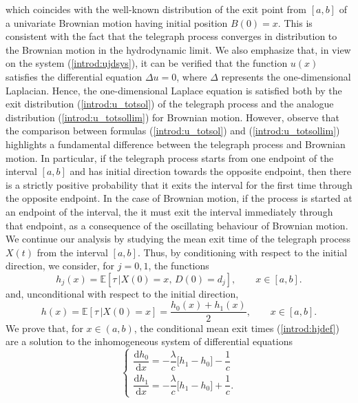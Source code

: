 \documentclass{article}
\begin{document}
which coincides with the well-known distribution of the exit point from $[a,b]$ of a univariate Brownian motion having initial position $B(0)=x$. This is consistent with the fact that the telegraph process converges in distribution to the Brownian motion in the hydrodynamic limit. We also emphasize that, in view on the system (\ref{introd:ujdsys}), it can be verified that the function $u(x)$ satisfies the differential equation $\Delta u = 0$, where $\Delta$ represents the one-dimensional Laplacian. Hence, the one-dimensional Laplace equation is satisfied both by the exit distribution (\ref{introd:u_totsol}) of the telegraph process and the analogue distribution (\ref{introd:u_totsollim}) for Brownian motion. However, observe that the comparison between formulas (\ref{introd:u_totsol}) and (\ref{introd:u_totsollim}) highlights a fundamental difference between the telegraph process and Brownian motion. In particular, if the telegraph process starts from one endpoint of the interval $[a,b]$ and has initial direction towards the opposite endpoint, then there is a strictly positive probability that it exits the interval for the first time through the opposite endpoint. In the case of Brownian motion, if the process is started at an endpoint of the interval, the it must exit the interval immediately through that endpoint, as a consequence of the oscillating behaviour of Brownian motion.\\
We continue our analysis by studying the mean exit time of the telegraph process $X(t)$ from the interval $[a,b]$. Thus, by conditioning with respect to the initial direction, we consider, for $j=0,1$, the functions
\begin{equation}h_j(x)=\mathbb{E}\left[\tau\,\Big\lvert X(0)=x,\,D(0)=d_j\right],\qquad x\in[a,b].\label{introd:hjdef}\end{equation} and, unconditional with respect to the initial direction,
\begin{equation*}h(x)=\mathbb{E}\left[\tau\,\Big\lvert X(0)=x\right]=\frac{h_0(x)+h_1(x)}{2},\qquad x\in[a,b].\end{equation*}%
We prove that, for $x\in(a,b)$, the conditional mean exit times (\ref{introd:hjdef}) are a solution to the inhomogeneous system of differential equations
\begin{equation}\label{introd:hjdsys}
\begin{cases}
\dfrac{\mathrm{d} h_0}{\mathrm{d}x}=-\dfrac{\lambda}{c}\big[h_1-h_0\big]-\dfrac{1}{c}\\[0.75em]
\dfrac{\mathrm{d} h_1}{\mathrm{d}x}=-\dfrac{\lambda}{c}\big[h_1-h_0\big]+\dfrac{1}{c}.
\end{cases}
\end{equation}
\end{document}
